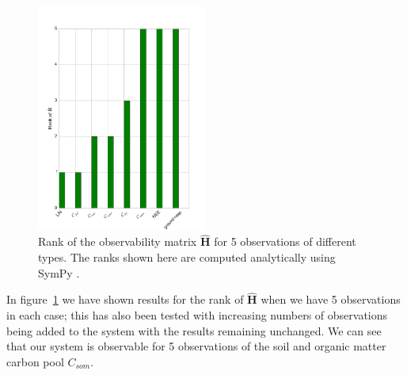 \begin{figure}[ht]
    \centering
    \includegraphics[width=0.5\textwidth]{chapter/chapter5/dalec1_obsrank.pdf}
    \caption{Rank of the observability matrix $\hat{\textbf{H}}$ for 5 observations of different types. The ranks shown here are computed analytically using SymPy \citep{Joyner:2012:OSC:2110170.2110185}.}
    \label{chap5:fig:D1_observability}
\end{figure}

In figure~\ref{chap5:fig:D1_observability} we have shown results for the rank of $\hat{\textbf{H}}$ when we have 5 observations in each case; this has also been tested with increasing numbers of observations being added to the system with the results remaining unchanged. We can see that our system is observable for 5 observations of the soil and organic matter carbon pool $C_{som}$.

